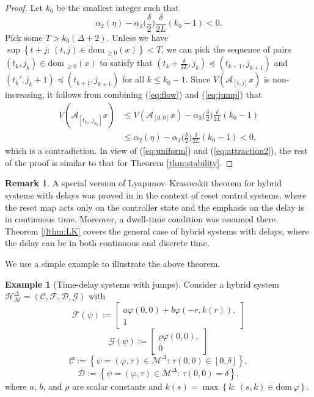 \documentclass[journal,final,twocolumn]{IEEEtran}
\theoremstyle{definition}
\newtheorem{rem}{Remark}
\newtheorem{ex}{Example}
\begin{document}
\begin{proof}
Let $k_0$ be the smallest integer such that
$$\alpha_2(\eta)-\alpha_3\Big(\frac{\delta}{2}\Big)\frac{\delta}{2L}(k_0-1)<0.$$
Pick some $T>k_0(\Delta+2)$. Unless we have $\sup{\left\{{t+j:\,(t,j)\in{\text{dom}\,}_{\ge 0}(x)}\right\}}<T$, we can pick the sequence of pairs $(t_k,j_k)\in{\text{dom}\,}_{\ge 0} (x)$ to satisfy that $(t_k+\frac{\delta}{2L},j_k)\preceq(t_{k+1},j_{k+1})$ and $(t_k',j_k+1)\preceq(t_{k+1},j_{k+1})$ for all $k\le k_0-1$. Since $V({\mathcal{A}}_{[t,j]}x)$ is non-increasing, it follows from combining (\ref{eq:flow}) and (\ref{eq:jump}) that
\begin{align*}
V({\mathcal{A}}_{[t_{k_0},j_{k_0}]}x)&\le V({\mathcal{A}}_{[0,0]}x)-\alpha_3\Big(\frac{\delta}{2}\Big)\frac{\delta}{2L}(k_0-1)\\
&\le\alpha_2(\eta)-\alpha_3\Big(\frac{\delta}{2}\Big)\frac{\delta}{2L}(k_0-1)<0,
\end{align*}
which is a contradiction. In view of (\ref{eq:uniform}) and (\ref{eq:attraction2}), the rest of the proof is similar to that for Theorem \ref{thm:stability}.

\end{proof}

\begin{rem}
A special version of Lyapunov--Krasovskii theorem for hybrid systems with delays was proved in \cite[Proposition 1]{banos2014delay} in the context of reset control systems, where the reset map acts only on the controller state and the emphasis on the delay is in continuous time. Moreover, a dwell-time condition was assumed there. Theorem \ref{jlthm:LK} covers the general case of hybrid systems with delays, where the delay can be in both continuous and discrete time.
\end{rem}

We use a simple example to illustrate the above theorem.

\begin{ex}[Time-delay systems with jumps]
Consider a hybrid system ${\mathcal{H}_{\mathcal{M}}^{\Delta}}=({\mathcal{C}},{\mathcal{F}},{\mathcal{D}},{\mathcal{G}})$ with
$$
{\mathcal{F}}(\psi):=\begin{bmatrix}a{\varphi}(0,0)+b{\varphi}(-r,k(r)),\\
1
\end{bmatrix}
$$
$$
{\mathcal{G}}(\psi):=\begin{bmatrix}\rho{\varphi}(0,0),\\
0
\end{bmatrix}
$$
$$
{\mathcal{C}}:={\left\{{\psi=({\varphi},\tau)\in{\mathcal{M}^{\Delta}}:\,\tau(0,0)\in [0,\delta]}\right\}},
$$
$$
{\mathcal{D}}:={\left\{{\psi=({\varphi},\tau)\in{\mathcal{M}^{\Delta}}:\,\tau(0,0)=\delta}\right\}},
$$
where $a$, $b$, and $\rho$ are scalar constants and $k(s)=\max{\left\{{k:\,(s,k)\in{\text{dom}\,} {\varphi}}\right\}}$.
\end{ex}
\end{document}
